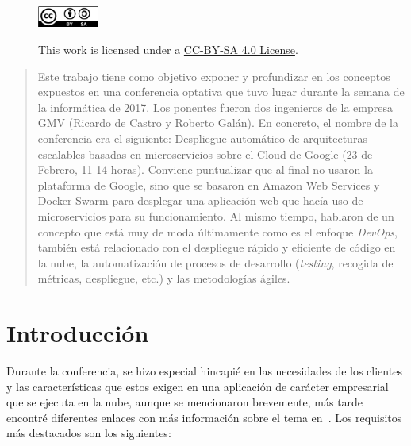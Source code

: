 \begin{titlepage}

\vfill %



\captionsetup[figure]{labelformat=empty,justification=raggedright,singlelinecheck=false}
\begin{figure}[h]

        \includegraphics[width=2cm,keepaspectratio]{cc-by-sa.png}
        \label{fig:by-sa}
        \caption{ This work is licensed under a \href{https://creativecommons.org/licenses/by/4.0/legalcode}{CC-BY-SA 4.0 License}.}

\end{figure}

\end{titlepage}

\tableofcontents
\clearpage

\begin{abstract}
Este trabajo tiene como objetivo exponer y profundizar en los conceptos expuestos en una conferencia optativa que tuvo lugar durante la semana de la informática de 2017. Los ponentes fueron dos ingenieros de la empresa GMV (Ricardo de Castro y Roberto Galán). En concreto, el nombre de la conferencia era el siguiente: Despliegue automático de arquitecturas escalables basadas en microservicios sobre el Cloud de Google (23 de Febrero, 11-14 horas). Conviene puntualizar que al final no usaron la plataforma de Google, sino que se basaron en Amazon Web Services y Docker Swarm para desplegar una aplicación web que hacía uso de microservicios para su funcionamiento. Al mismo tiempo, hablaron de un concepto que está muy de moda últimamente como es el enfoque \emph{DevOps}, también está relacionado con el despliegue rápido y eficiente de código en la nube, la automatización de procesos de desarrollo (\textit{testing}, recogida de métricas, despliegue, etc.) y las metodologías ágiles.
\end{abstract}

\section{Introducción}\label{sec:intro}

Durante la conferencia, se hizo especial hincapié en las necesidades de los clientes y las características que estos exigen en una aplicación de carácter empresarial que se ejecuta en la nube, aunque se mencionaron brevemente, más tarde encontré diferentes enlaces con más información sobre el tema en~\cite{reliab}. Los requisitos más destacados son los siguientes:

